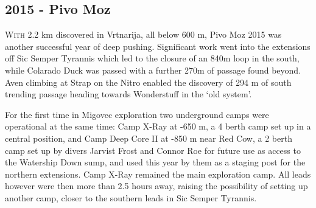 \newpage
\begin{tcolorbox}
\chapter{2015 - Pivo Moz}
		\lettrine{W}{ith} 2.2 km discovered in Vrtnarija, all below 600 m, Pivo Moz 2015 was another successful year of deep pushing. Significant work went into the extensions off Sic Semper Tyrannis which led to the closure of an 840m loop in the south, while Colarado Duck was passed with a further 270m of passage found beyond. Aven climbing at Strap on the Nitro enabled the discovery of 294 m of south trending passage heading towards Wonderstuff in the ‘old system’. 

		For the first time in Migovec exploration two underground camps were operational at the same time: Camp X-Ray at -650 m, a 4 berth camp set up in a central position, and Camp Deep Core II at -850 m near Red Cow, a 2 berth camp set up by divers Jarvist Frost and Connor Roe for future use as access to the Watership Down sump, and used this year by them as a staging post for the northern extensions. Camp X-Ray remained the main exploration camp. All leads however were then more than 2.5 hours away, raising the possibility of setting up another camp, closer to the southern leads in Sic Semper Tyrannis.
	

\end{tcolorbox}
\BgThispage



